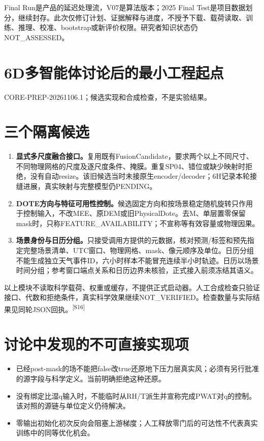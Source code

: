 \documentclass[UTF8,10.5pt,a4paper,fontset=none]{ctexart}
\newcommand{\evi}[1]{\textsuperscript{\color{muted}[#1]}}
\newcommand{\pageheading}[2]{\clearpage\section*{#1}\textcolor{muted}{#2}\par\vspace{3pt}}
\begin{document}
Final Run是产品的延迟处理流，V07是算法版本；2025 Final Test是项目数据划分，继续封存。此次仅修订计划、证据解释与进度，不授予下载、载荷读取、训练、推理、校准、bootstrap或新评价权限。研究者知识状态仍NOT\_ASSESSED。

\pageheading{6D\quad 多智能体讨论后的最小工程起点}{CORE-PREP-20261106.1；候选实现和合成检查，不是实验结果。}
\section*{三个隔离候选}
\begin{enumerate}[leftmargin=2em,itemsep=6pt]
\item \textbf{显式多尺度融合接口。}复用既有FusionCandidate，要求两个以上不同尺寸、不同物理网格的尺度及逐尺度条件、掩膜。重复SP04、错位或缺少映射时拒绝，没有自动resize。该旧候选当时未接原生encoder/decoder；6H记录本轮接缝进展，真实映射与完整模型仍PENDING。
\item \textbf{DOTE方向与特征可用性控制。}候选固定方向和按场景稳定随机旋转只作用于控制输入，不改MEE、原DEM或旧PhysicalDote。去M、单层置零保留mask时，只称FEATURE\_AVAILABILITY；不宣称等有效容量或物理因果。
\item \textbf{场景身份与日历分组。}只接受调用方提供的元数据，核对预测/标签和预先指定完整场景清单、UTC窗口、物理网格、mask、像元顺序及单位。日历分组不能生成独立天气事件ID，六小时样本不能冒充连续半小时轨迹。日历以场景时间分组；参考窗口端点关系和日历边界未核验，正式接入前须冻结其语义。
\end{enumerate}
以上模块不读取科学载荷、权重或缓存，不提供正式启动器。人工合成检查只验证接口、代数和拒绝条件，真实科学效果继续NOT\_VERIFIED。检查数量与实际结果见同轮JSON回执。\evi{S16}

\section*{讨论中发现的不可直接实现项}
\begin{itemize}
\item 已经post-mask的场不能把false改true还原地下压力层真实风；必须有另行批准的源字段与科学定义。当前明确拒绝这种还原。
\item 没有绑定比湿q输入时，不能临时从RH/T派生并宣称完成PWAT对q的控制。该对照的源链与单位定义仍待解决。
\item 零输出初始化初次反向会阻塞上游梯度；人工释放零门后的可达性不代表真实训练中的同等优化机会。
\end{itemize}
\end{document}
